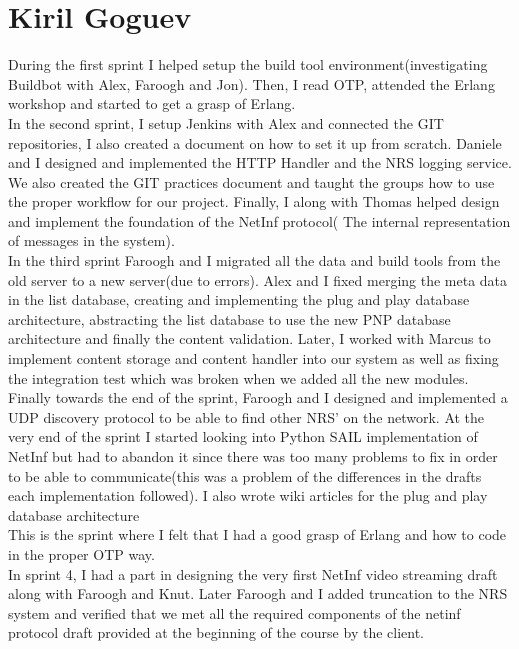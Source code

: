 \section{Kiril Goguev}

During the first sprint I helped setup the build tool environment(investigating Buildbot with Alex, Faroogh and Jon). Then, I read OTP, attended the Erlang workshop and started to get a grasp of Erlang.\\

In the second sprint, I setup Jenkins with Alex and connected the GIT repositories, I also created a document on how to set it up from scratch. 
Daniele and I designed and implemented the HTTP Handler and the NRS logging service. We also created the GIT practices document and taught the groups how to use the proper workflow for our project. Finally,
I along with Thomas helped design and implement the foundation of the NetInf protocol( The internal representation of messages in the system).\\


In the third sprint
Faroogh and I migrated all the data and build tools from the old server to a new server(due to errors).
Alex and I fixed merging the meta data in the list database, creating and implementing the plug and play database architecture, abstracting the list database to use the new PNP database architecture and finally the content validation. 
Later, I worked with Marcus to implement content storage and content handler into our system as well as fixing the integration test which was broken when we added all the new modules. 
Finally towards the end of the sprint, Faroogh and I designed and implemented a UDP discovery protocol to be able to find other NRS' on the network.
At the very end of the sprint I started looking into Python SAIL implementation of NetInf but had to abandon it since there was too many problems to fix in order to be able to communicate(this was a problem of the differences in the drafts each implementation followed). 
I also wrote wiki articles for the plug and play database architecture\\

This is the sprint where I felt that I had a good grasp of Erlang and how to code in the proper OTP way. \\

In sprint 4,
I had a part in designing the very first NetInf video streaming draft along with Faroogh and Knut. 
Later Faroogh and I added truncation to the NRS system and verified that we met all the required components of the netinf protocol draft provided at the beginning of the course by the client. \\

